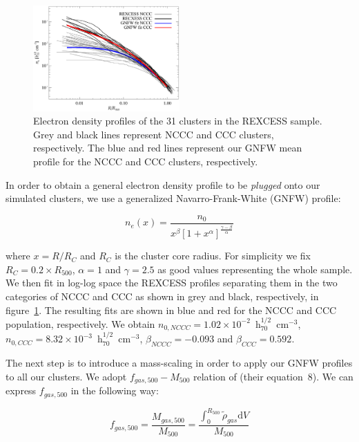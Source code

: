 \documentclass[traditabstract]{aa}
\newcommand{\rmn}{\mathrm}
\begin{document}
\begin{figure}[hbt!]
\centering
\includegraphics[width=0.5\textwidth]{figures/gas_profiles.eps}
\caption{Electron density profiles of the 31 clusters in the REXCESS sample. Grey and black lines represent NCCC and CCC clusters, respectively. The blue and red lines represent our GNFW mean profile for the NCCC and CCC clusters, respectively.}
\label{fig:gas_profiles}
\end{figure}

In order to obtain a general electron density profile to be \emph{plugged} onto our simulated clusters, we use a generalized Navarro-Frank-White (GNFW) profile:

\begin{equation}
n_{e}(x) = \frac{n_{0}}{x^{\beta}\left[1+x^{\alpha}\right]^{\frac{\gamma-\beta}{\alpha}}}
\label{eq:gnfw}
\end{equation}

where $x=R/R_{C}$ and $R_{C}$ is the cluster core radius. For simplicity we fix $R_{C} = 0.2 \times R_{500}$, $\alpha = 1$ and $\gamma = 2.5$ as good values representing the whole sample. We then fit in log-log space the REXCESS profiles separating them in the two categories of NCCC and CCC as shown in grey and black, respectively, in figure~\ref{fig:gas_profiles}. The resulting fits are shown in blue and red for the NCCC and CCC population, respectively. We obtain $n_{0,NCCC} = 1.02\times10^{-2}$~h$_{70}^{1/2}$~cm$^{-3}$, $n_{0,CCC} = 8.32\times10^{-3}$~h$_{70}^{1/2}$~cm$^{-3}$, $\beta_{NCCC} = -0.093$ and $\beta_{CCC} = 0.592$.

The next step is to introduce a mass-scaling in order to apply our GNFW profiles to all our clusters. We adopt $f_{gas,500}-M_{500}$ relation of \cite{2009ApJ...693.1142S} (their equation~8). We can express $f_{gas,500}$ in the following way:

\begin{equation}
f_{gas,500} = \frac{M_{gas,500}}{M_{500}}  = \frac{\int_{0}^{R_{500}} \tilde{\rho}_{gas} \rmn{d}V}{M_{500}}
\label{eq:m500}
\end{equation}
\end{document}
